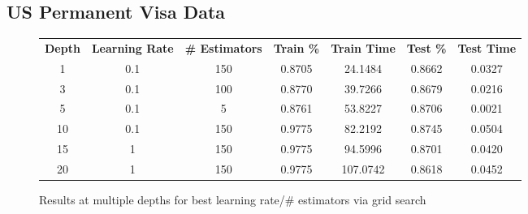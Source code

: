 \documentclass[h]{article}
\begin{document}
\subsection*{US Permanent Visa Data}
\begin{figure}[H]
\begin{tabular}{ | c | c  | c | c | c | c | c |} 
\hline
\textbf{Depth} & \textbf{Learning Rate} & \textbf{\# Estimators} & \textbf{Train \%} & \textbf{Train Time} & \textbf{Test \%} & \textbf{Test Time}   \\
1 & 0.1 & 150 & 0.8705 & 24.1484 & 0.8662 & 0.0327 \\ \hline
3 & 0.1 & 100 & 0.8770 & 39.7266 & 0.8679 & 0.0216 \\ \hline
5 & 0.1 & 5 & 0.8761 & 53.8227 & 0.8706 & 0.0021 \\ \hline
10 & 0.1 & 150 & 0.9775 & 82.2192 & 0.8745 & 0.0504 \\ \hline
15 & 1 & 150 & 0.9775 & 94.5996 & 0.8701 & 0.0420 \\ \hline
20 & 1 & 150 & 0.9775 & 107.0742 & 0.8618 & 0.0452 \\ \hline
\hline


\end{tabular}
\caption*{Results at multiple depths for best learning rate/# estimators via grid search}
\endminipage\hfill
\end{figure}
\end{document}
